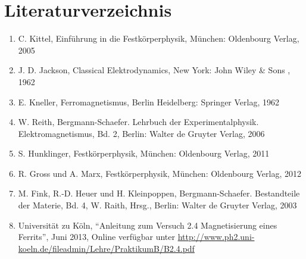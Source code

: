 \documentclass[12pt,a4paper]{scrartcl}
\numberwithin{equation}{section} %
\renewcommand{\[}{} %
\renewcommand{\]}{\noindent} %
\newcommand{\tightlist}{} %
\begin{document}
\hypertarget{literaturverzeichnis}{%
\section{Literaturverzeichnis}\label{literaturverzeichnis}}

\begin{enumerate}
\def\labelenumi{\arabic{enumi}.}
\tightlist
\item
  C. Kittel, Einführung in die Festkörperphysik, München: Oldenbourg
  Verlag, 2005
\item
  J. D. Jackson, Classical Elektrodynamics, New York: John Wiley \& Sons
  , 1962
\item
  E. Kneller, Ferromagnetismus, Berlin Heidelberg: Springer Verlag, 1962
\item
  W. Reith, Bergmann-Schaefer. Lehrbuch der Experimentalphysik.
  Elektromagnetismus, Bd. 2, Berlin: Walter de Gruyter Verlag, 2006
\item
  S. Hunklinger, Festkörperphysik, München: Oldenbourg Verlag, 2011
\item
  R. Gross und A. Marx, Festkörperphysik, München: Oldenbourg Verlag,
  2012
\item
  M. Fink, R.-D. Heuer und H. Kleinpoppen, Bergmann-Schaefer.
  Bestandteile der Materie, Bd. 4, W. Raith, Hrsg., Berlin: Walter de
  Gruyter Verlag, 2003
\item
  Universität zu Köln, ``Anleitung zum Versuch 2.4 Magnetisierung eines
  Ferrits'', Juni 2013, Online verfügbar unter
  \url{http://www.ph2.uni-koeln.de/fileadmin/Lehre/PraktikumB/B2.4.pdf}
\end{enumerate}
\end{document}
